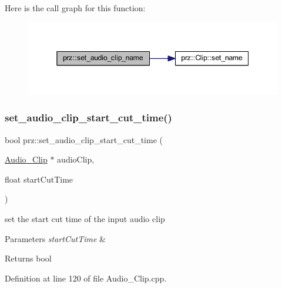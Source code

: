 Here is the call graph for this function\+:
\nopagebreak
\begin{figure}[H]
\begin{center}
\leavevmode
\includegraphics[width=345pt]{namespaceprz_abbc097e730e2a3eb42a2f205fd714bf2_cgraph}
\end{center}
\end{figure}
\mbox{\label{namespaceprz_a8ed2ed05812cc89ec640c5fe96182e94}} 
\subsubsection{\texorpdfstring{set\_audio\_clip\_start\_cut\_time()}{set\_audio\_clip\_start\_cut\_time()}}
{\footnotesize\ttfamily bool prz\+::set\+\_\+audio\+\_\+clip\+\_\+start\+\_\+cut\+\_\+time (\begin{DoxyParamCaption}\item[{\mbox{\hyperlink{classprz_1_1_audio___clip}{Audio\+\_\+\+Clip}} $\ast$}]{audio\+Clip,  }\item[{float}]{start\+Cut\+Time }\end{DoxyParamCaption})}



set the start cut time of the input audio clip 


\begin{DoxyParams}{Parameters}
{\em start\+Cut\+Time} & \\
\hline
\end{DoxyParams}
\begin{DoxyReturn}{Returns}
bool 
\end{DoxyReturn}


Definition at line 120 of file Audio\+\_\+\+Clip.\+cpp.

